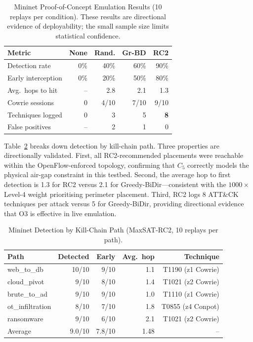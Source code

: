 \documentclass[journal]{IEEEtran}
\begin{document}
\begin{table}[t]
\caption{Mininet Proof-of-Concept Emulation Results
  (10 replays per condition). These results are directional evidence
  of deployability; the small sample size limits statistical
  confidence.}
\label{tab:emulation}
\centering
\renewcommand{\arraystretch}{1.2}
\begin{tabular}{p{2.6cm}rrrr}
\toprule
Metric & None & Rand. & Gr-BD & RC2 \\
\midrule
Detection rate     & 0\%  & 40\%  & 60\%  & 90\% \\
Early interception & 0\%  & 20\%  & 50\%  & 80\% \\
Avg.\ hops to hit  & --   & 2.8   & 2.1   & 1.3  \\
Cowrie sessions    & 0    & 4/10  & 7/10  & 9/10 \\
Techniques logged  & 0    & 3     & 5     & \textbf{8}    \\
False positives    & --   & 2     & 1     & 0    \\
\bottomrule
\end{tabular}
\end{table}

Table~\ref{tab:emulation_paths} breaks down detection by kill-chain
path. Three properties are directionally validated. First, all
RC2-recommended placements were reachable within the
OpenFlow-enforced topology, confirming that $C_5$ correctly models
the physical air-gap constraint in this testbed. Second, the average
hop to first detection is 1.3 for RC2 versus 2.1 for
Greedy-BiDir---consistent with the $1000\times$ Level-4 weight
prioritising perimeter placement. Third, RC2 logs 8 ATT\&CK
techniques per attack versus 5 for Greedy-BiDir, providing
directional evidence that O3 is effective in live emulation.

\begin{table}[t]
\caption{Mininet Detection by Kill-Chain Path (MaxSAT-RC2,
  10 replays per path).}
\label{tab:emulation_paths}
\centering
\renewcommand{\arraystretch}{1.2}
\begin{tabular}{lrrrr}
\toprule
Path & Detected & Early & Avg.\ hop & Technique \\
\midrule
web\_to\_db      & 10/10 & 9/10 & 1.1 & T1190 (z1 Cowrie) \\
cloud\_pivot     & 9/10  & 8/10 & 1.4 & T1021 (z2 Cowrie) \\
brute\_to\_ad    & 9/10  & 9/10 & 1.0 & T1110 (z1 Cowrie) \\
ot\_infiltration & 8/10  & 7/10 & 1.8 & T0855 (z4 Conpot) \\
ransomware       & 9/10  & 6/10 & 2.1 & T1021 (z2 Cowrie) \\
\midrule
Average & 9.0/10 & 7.8/10 & 1.48 & -- \\
\bottomrule
\end{tabular}
\end{table}
\end{document}
